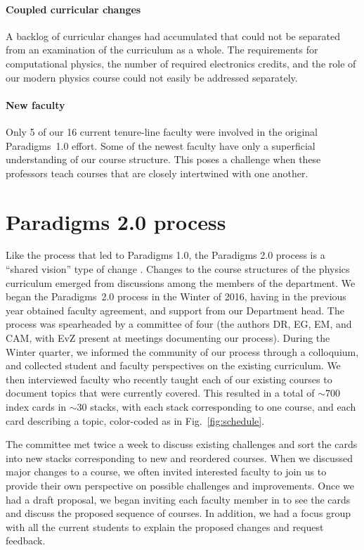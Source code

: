 \documentclass[english,aps,pra,reprint,noshowpacs,superscriptaddress]{revtex4-1}
\begin{document}
\paragraph{Coupled curricular changes}
A backlog of curricular changes had accumulated that could not be
separated from an examination of the curriculum as a whole.  The requirements
for computational physics, the number of required electronics credits, and the
role of our modern physics course could not easily be addressed separately.

\paragraph{New faculty}

Only 5 of our 16 current tenure-line faculty were involved in the
original Paradigms~1.0 effort.  Some of the newest faculty have only a
superficial understanding of our course structure.  This poses a
challenge when these professors teach courses that are closely
intertwined with one another.

\section{Paradigms 2.0 process}
Like the process that led to Paradigms 1.0, the Paradigms 2.0 process is a ``shared vision'' type of change \cite{henderson2010}. Changes to the course structures of the physics curriculum emerged from discussions among the members of the department. We began the Paradigms~2.0 process in the Winter of 2016, having in
the previous year obtained faculty agreement, and support from our
Department head.  The process was spearheaded by a committee of four
(the authors DR, EG, EM, and CAM, with EvZ present at meetings
documenting our process).  During the Winter quarter, we informed the
community of our process through a colloquium, and collected student
and faculty perspectives on the existing curriculum.  We then
interviewed faculty who recently taught each of our existing courses
to document topics that were currently covered.  This resulted in a
total of $\sim$700 index cards in $\sim$30 stacks, with each stack
corresponding to one course, and each card describing a topic,
color-coded as in Fig.~\ref{fig:schedule}.

The committee met twice a week to discuss existing challenges and sort
the cards into new stacks corresponding to new and reordered courses.
When we discussed major changes to a course, we often invited
interested faculty to join us to provide their own perspective on
possible challenges and improvements.  Once we had a draft proposal,
we began inviting each faculty member in to see the cards and discuss
the proposed sequence of courses.  In addition, we had a focus group with
all the current students to explain the proposed changes and request
feedback.
\end{document}
